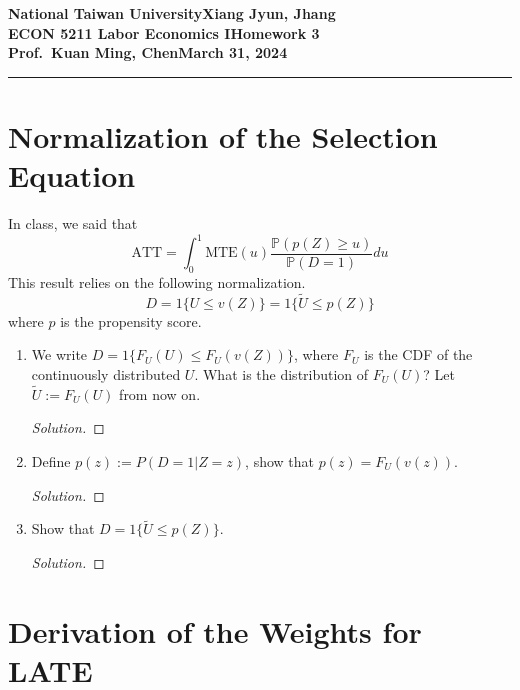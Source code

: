 \documentclass[11pt]{article}
\newenvironment{solution}{%
  \renewcommand\qedsymbol{$\blacksquare$}%
  \begin{mdframed}[backgroundcolor=gray!15]%
  \begin{proof}[Solution]}%
  {\end{proof}%
  \end{mdframed}}%
\newcommand{\myname}{Xiang Jyun, Jhang}
\newcommand{\assignment}{Homework 3}
\newcommand{\duedate}{March 31, 2024}
\newcommand{\pr}{\mathbb{P}}
\begin{document}
\textbf{National Taiwan University}\hfill\textbf{\myname}\\[0.01in]
\textbf{ECON 5211 Labor Economics I}\hfill\textbf{\assignment}\\[0.01in]
\textbf{Prof.\ Kuan Ming, Chen}\hfill\textbf{\duedate}\\
\smallskip\hrule\bigskip


\section{Normalization of the Selection Equation}

    In class, we said that 
    \[
        \text{ATT} = \int_{0}^{1} \text{MTE}(u) \frac{\pr(p(Z)\geq u)}{\pr(D=1)}du 
    \] 
    This result relies on the following normalization.
    \[ 
        D = 1\{U \leq v(Z)\} = 1\{\tilde{U} \leq p(Z)\} 
    \]
    where $p$ is the propensity score.
    \begin{enumerate}

        \item We write \( D = 1\{F_U(U) \leq F_U(v(Z))\} \), where \( F_U \) is the CDF of the continuously distributed \( U \). What is the distribution of \( F_U(U) \)? Let \( \tilde{U} := F_U(U) \) from now on.
        
            \begin{solution}
                
            \end{solution}
        
        \item Define \( p(z) := P(D = 1|Z = z) \), show that \( p(z) = F_U(v(z)) \).
        
            \begin{solution}
                
            \end{solution}
        
        \item Show that \( D = 1\{\tilde{U} \leq p(Z)\} \).
        
            \begin{solution}
                
            \end{solution}
        
    \end{enumerate}


\section{Derivation of the Weights for LATE}
\end{document}
